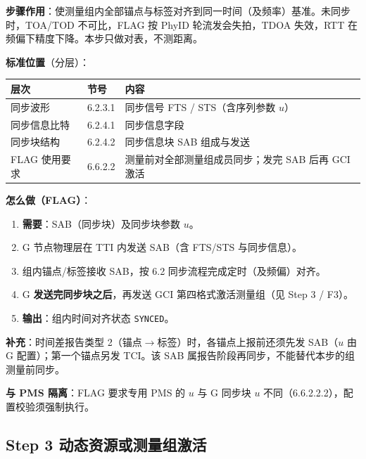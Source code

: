 \documentclass[11pt,a4paper]{ctexart}
\begin{document}
\textbf{步骤作用}：使测量组内全部锚点与标签对齐到同一时间（及频率）基准。未同步时，TOA/TOD 不可比，FLAG 按 PhyID 轮流发会失拍，TDOA 失效，RTT 在频偏下精度下降。本步只做对表，不测距离。

\textbf{标准位置}（分层）：
\begin{table}[h]
\centering
\small
\begin{tabular}{lll}
\toprule
\textbf{层次} & \textbf{节号} & \textbf{内容} \\
\midrule
同步波形 & 6.2.3.1 & 同步信号 FTS / STS（含序列参数 $u$） \\
同步信息比特 & 6.2.4.1 & 同步信息字段 \\
同步块结构 & 6.2.4.2 & 同步信息块 SAB 组成与发送 \\
FLAG 使用要求 & 6.6.2.2 & 测量前对全部测量组成员同步；发完 SAB 后再 GCI 激活 \\
\bottomrule
\end{tabular}
\end{table}

\textbf{怎么做（FLAG）}：
\begin{enumerate}
  \item \textbf{需要}：SAB（同步块）及同步块参数 $u$。
  \item G 节点物理层在 TTI 内发送 SAB（含 FTS/STS 与同步信息）。
  \item 组内锚点/标签接收 SAB，按 6.2 同步流程完成定时（及频偏）对齐。
  \item G \textbf{发送完同步块之后}，再发送 GCI 第四格式激活测量组（见 Step 3 / F3）。
  \item \textbf{输出}：组内时间对齐状态 \texttt{SYNCED}。
\end{enumerate}

\textbf{补充}：时间差报告类型 2（锚点$\to$标签）时，各锚点上报前还须先发 SAB（$u$ 由 G 配置）；第一个锚点另发 TCI。该 SAB 属报告阶段再同步，不能替代本步的组测量前同步。

\textbf{与 PMS 隔离}：FLAG 要求专用 PMS 的 $u$ 与 G 同步块 $u$ 不同（6.6.2.2.2），配置校验须强制执行。

\subsection{Step 3 动态资源或测量组激活}
\end{document}
